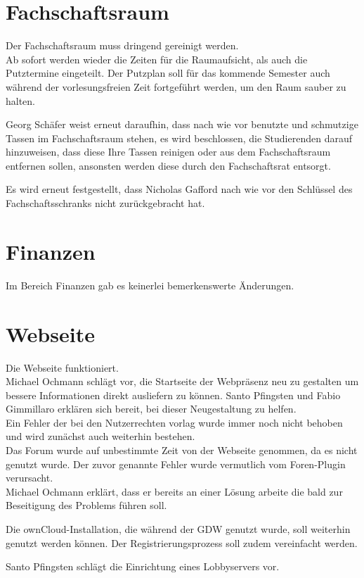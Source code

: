 \documentclass[a4paper, 11pt]{article} %
\begin{document}
\section{Fachschaftsraum}
Der Fachschaftsraum muss dringend gereinigt werden.\\
Ab sofort werden wieder die Zeiten für die Raumaufsicht, als auch die Putztermine eingeteilt.
Der Putzplan soll für das kommende Semester auch während der vorlesungsfreien Zeit fortgeführt werden, um den Raum sauber zu halten.
\begin{flushleft}
Georg Schäfer weist erneut daraufhin, dass nach wie vor benutzte und schmutzige Tassen im Fachschaftsraum stehen, es wird beschlossen, die Studierenden darauf hinzuweisen, dass diese Ihre Tassen reinigen oder aus dem Fachschaftsraum entfernen sollen, ansonsten werden diese durch den Fachschaftsrat entsorgt.
\end{flushleft}
\begin{flushleft}
Es wird erneut festgestellt, dass Nicholas Gafford nach wie vor den Schlüssel des Fachschaftsschranks nicht zurückgebracht hat.
\end{flushleft}
\pagebreak

\section{Finanzen}
Im Bereich Finanzen gab es keinerlei bemerkenswerte Änderungen.

\section{Webseite}
Die Webseite funktioniert.\\
Michael Ochmann schlägt vor, die Startseite der Webpräsenz neu zu gestalten um bessere Informationen direkt ausliefern zu können. Santo Pfingsten und Fabio Gimmillaro erklären sich bereit, bei dieser Neugestaltung zu helfen.\\
Ein Fehler der bei den Nutzerrechten vorlag wurde immer noch nicht behoben und wird zunächst auch weiterhin bestehen.\\
Das Forum wurde auf unbestimmte Zeit  von der Webseite genommen, da es nicht genutzt wurde. Der zuvor genannte Fehler wurde vermutlich vom Foren-Plugin verursacht.\\
Michael Ochmann erklärt, dass er bereits an einer Lösung arbeite die bald zur Beseitigung des Problems führen soll.
\begin{flushleft}
	Die ownCloud-Installation, die während der GDW genutzt wurde, soll weiterhin genutzt werden können. Der Registrierungsprozess soll zudem vereinfacht werden.
\end{flushleft}
\begin{flushleft}
	Santo Pfingsten schlägt die Einrichtung eines Lobbyservers vor.
\end{flushleft}
\end{document}
